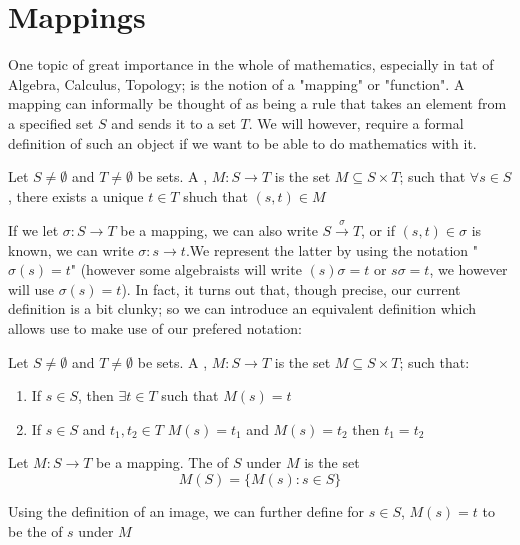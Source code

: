 
\section{Mappings}

\hspace{5mm}One topic of great importance in the whole of mathematics, especially in tat of Algebra, Calculus, Topology; is the notion of a "mapping" or "function". A mapping can informally be thought of as being a rule that takes an element from a specified set $S$ and sends it to a set $T$. We will however, require a formal definition of such an object if we want to be able to do mathematics with it.

\begin{definition}
    Let $S \neq \emptyset$ and $T \neq \emptyset$ be sets. A , $M:S \rightarrow T$ is the set $M \subseteq S \times T$; such that $\forall s \in S$, there exists a unique $t \in T$ shuch that $(s,t) \in M$
\end{definition}

If we let $\sigma :S \rightarrow T$ be a mapping, we can also write $S\xrightarrow{\sigma} T$, or if $(s,t) \in \sigma$ is known, we can write $\sigma :s \rightarrow t$.We represent the latter by using the notation "$\sigma(s)=t$" (however some algebraists will write $(s)\sigma =t$ or $s\sigma = t$, we however will use $\sigma(s)=t$). In fact, it turns out that, though precise, our current definition is a bit clunky; so we can introduce an equivalent definition which allows use to make use of our prefered notation:

\begin{definition}
    Let $S \neq \emptyset$ and $T \neq \emptyset$ be sets. A , $M:S \rightarrow T$ is the set $M \subseteq S \times T$; such that:
        \begin{enumerate}
            \item If $s \in S$, then  $\exists t \in T$ such that $M(s)=t$
            \item If $s \in S$ and $t_1,t_2 \in T$ $M(s)=t_1$ and $M(s)=t_2$ then $t_1=t_2$
        \end{enumerate}
\end{definition}

\begin{definition}
    Let $M:S \rightarrow T$ be a mapping. The  of $S$ under $M$ is the set
        \begin{equation}
            M(S)=\{M(s):s \in S\}
        \end{equation}
\end{definition}

Using the definition of an image, we can further define for $s \in S$, $M(s)=t$ to be the  of $s$ under $M$
